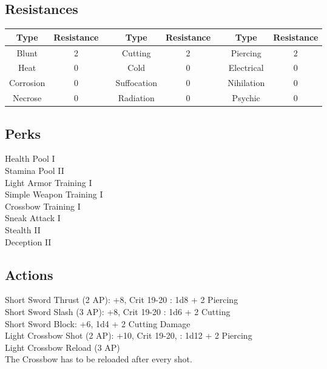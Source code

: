 \subsection{Resistances}
\begin{minipage}[H]{1\textwidth}
	\centering
	\begin{tabular}[c]{|c | c | c | c | c | c | c | c|}
		\hline
		Type & Resistance && Type & Resistance && Type & Resistance\\
		\hline
		Blunt & 2 &&
		Cutting & 2 &&
		Piercing & 2\\
		Heat & 0 &&
		Cold & 0 &&
		Electrical & 0\\
		Corrosion & 0 &&
		Suffocation & 0 &&
		Nihilation & 0 \\
		Necrose & 0 &&
		Radiation & 0 &&
		Psychic & 0\\
		\hline
	\end{tabular}
\end{minipage}

\subsection{Perks}
Health Pool I\\
Stamina Pool II\\
Light Armor Training I\\
Simple Weapon Training I\\
Crossbow Training I\\
Sneak Attack I\\
Stealth II\\
Deception II\\

\subsection{Actions}
Short Sword Thrust (2 AP): +8, Crit 19-20 : 1d8 + 2 Piercing\\

Short Sword Slash (3 AP): +8, Crit 19-20 : 1d6 + 2 Cutting\\

Short Sword Block: +6, 1d4 + 2 Cutting Damage\\

Light Crossbow Shot (2 AP): +10, Crit 19-20, : 1d12 + 2 Piercing\\

Light Crossbow Reload (3 AP)\\
The Crossbow has to be reloaded after every shot.


